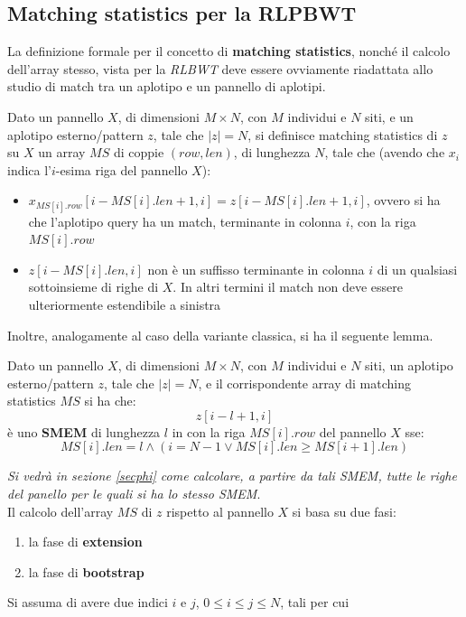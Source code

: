 \subsection{Matching statistics per la RLPBWT}
La definizione formale per il concetto di \textbf{matching statistics}, nonché
il calcolo dell'array stesso, vista per
la \textit{RLBWT} deve essere ovviamente riadattata allo studio di match tra un
aplotipo e un pannello di aplotipi.
\begin{definizione}
  Dato un pannello $X$, di dimensioni $M\times N$, con $M$ individui e $N$ siti,
  e un aplotipo esterno/pattern $z$, tale che $|z|=N$, si definisce matching
  statistics di $z$ su $X$ un array $MS$ di coppie $(row,len)$, di lunghezza
  $N$, tale che (avendo che $x_i$ indica l'$i$-esima riga del pannello $X$): 
  \begin{itemize}
    \item $x_{MS[i].row}[i-MS[i].len+1,i]=z[i-MS[i].len+1,i]$, ovvero si ha che
    l'aplotipo query ha un match, terminante in colonna $i$, con la riga
    $MS[i].row$  
    \item $z[i-MS[i].len,i]$ non è un suffisso terminante in colonna $i$ di un
    qualsiasi sottoinsieme di righe di $X$. In altri termini il match non deve
    essere ulteriormente estendibile a sinistra
  \end{itemize}
\end{definizione}
Inoltre, analogamente al caso della variante classica, si ha il seguente lemma.
\begin{lemma}
  Dato un pannello $X$, di dimensioni $M\times N$, con $M$ individui e $N$
  siti, un aplotipo esterno/pattern $z$, tale che $|z|=N$, e il corrispondente
  array di matching statistics $MS$ si ha che:
  \[z[i-l+1,i]\]
  è uno \textbf{SMEM} di lunghezza $l$ in con la riga $MS[i].row$ del pannello
  $X$ sse: 
  \[MS[i].len=l\land(i=N-1\lor MS[i].len\geq MS[i+1].len)\]
\end{lemma}
\textit{Si vedrà in sezione \ref{secphi} come calcolare, a partire da tali
  \emph{SMEM}, tutte le righe del panello per le quali si ha lo stesso
  \textup{SMEM}}.\\
Il calcolo dell'array $MS$ di $z$ rispetto al pannello $X$ si basa su due fasi:
\begin{enumerate}
  \item la fase di \textbf{extension}
  \item la fase di \textbf{bootstrap}
\end{enumerate}
Si assuma di avere due indici $i$ e $j$, $0\leq i\leq j\leq N$, tali per cui
